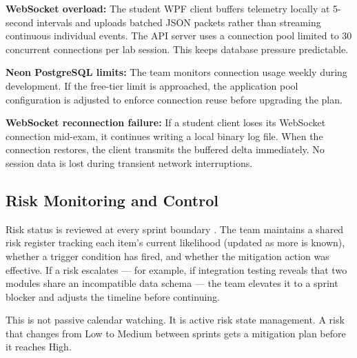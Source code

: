 \textbf{WebSocket overload:} The student WPF client buffers telemetry locally at 5-second intervals and uploads batched JSON packets rather than streaming continuous individual events. The API server uses a connection pool limited to 30 concurrent connections per lab session. This keeps database pressure predictable.

\textbf{Neon PostgreSQL limits:} The team monitors connection usage weekly during development. If the free-tier limit is approached, the application pool configuration is adjusted to enforce connection reuse before upgrading the plan.

\textbf{WebSocket reconnection failure:} If a student client loses its WebSocket connection mid-exam, it continues writing a local binary log file. When the connection restores, the client transmits the buffered delta immediately. No session data is lost during transient network interruptions.

\subsection{Risk Monitoring and Control}

Risk status is reviewed at every sprint boundary \cite{scrum1}. The team maintains a shared risk register tracking each item's current likelihood (updated as more is known), whether a trigger condition has fired, and whether the mitigation action was effective. If a risk escalates — for example, if integration testing reveals that two modules share an incompatible data schema — the team elevates it to a sprint blocker and adjusts the timeline before continuing.

This is not passive calendar watching. It is active risk state management. A risk that changes from Low to Medium between sprints gets a mitigation plan before it reaches High.

